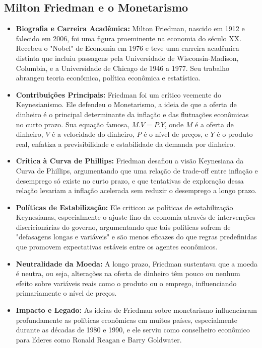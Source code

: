 \documentclass[a4paper,12pt]{article}[abntex2]
\begin{document}
\subsection{Milton Friedman e o Monetarismo}
\begin{itemize}
  \item \textbf{Biografia e Carreira Acadêmica:} Milton Friedman, nascido em 1912 e falecido em 2006, foi uma figura proeminente na economia do século XX. Recebeu o "Nobel" de Economia em 1976 e teve uma carreira acadêmica distinta que incluiu passagens pela Universidade de Wisconsin-Madison, Columbia, e a Universidade de Chicago de 1946 a 1977. Seu trabalho abrangeu teoria econômica, política econômica e estatística.

  \item \textbf{Contribuições Principais:} Friedman foi um crítico veemente do Keynesianismo. Ele defendeu o Monetarismo, a ideia de que a oferta de dinheiro é o principal determinante da inflação e das flutuações econômicas no curto prazo. Sua equação famosa, \(M.V = P.Y\), onde \(M\) é a oferta de dinheiro, \(V\) é a velocidade do dinheiro, \(P\) é o nível de preços, e \(Y\) é o produto real, enfatiza a previsibilidade e estabilidade da demanda por dinheiro.

  \item \textbf{Crítica à Curva de Phillips:} Friedman desafiou a visão Keynesiana da Curva de Phillips, argumentando que uma relação de trade-off entre inflação e desemprego só existe no curto prazo, e que tentativas de exploração dessa relação levariam a inflação acelerada sem reduzir o desemprego a longo prazo.

  \item \textbf{Políticas de Estabilização:} Ele criticou as políticas de estabilização Keynesianas, especialmente o ajuste fino da economia através de intervenções discricionárias do governo, argumentando que tais políticas sofrem de "defasagens longas e variáveis" e são menos eficazes do que regras predefinidas que promovem expectativas estáveis entre os agentes econômicos.

  \item \textbf{Neutralidade da Moeda:} A longo prazo, Friedman sustentava que a moeda é neutra, ou seja, alterações na oferta de dinheiro têm pouco ou nenhum efeito sobre variáveis reais como o produto ou o emprego, influenciando primariamente o nível de preços.

  \item \textbf{Impacto e Legado:} As ideias de Friedman sobre monetarismo influenciaram profundamente as políticas econômicas em muitos países, especialmente durante as décadas de 1980 e 1990, e ele serviu como conselheiro econômico para líderes como Ronald Reagan e Barry Goldwater.
\end{itemize}
\end{document}
